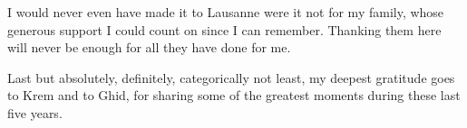 I would never even have made it to Lausanne were it not for my family, whose
generous support I could count on since I can remember. Thanking them here will
never be enough for all they have done for me. 

Last but absolutely, definitely, categorically not least, my deepest gratitude
goes to Krem and to Ghid, for sharing some of the greatest moments during these
last five years.
